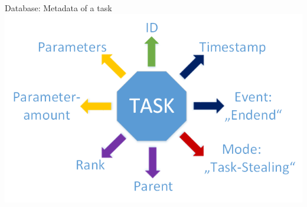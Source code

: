 	\begin{frame}{Database: Metadata of a task}
	\includegraphics[width=1.0\textwidth]{images/Zeichnungedited.png}
	\end{frame}
	
